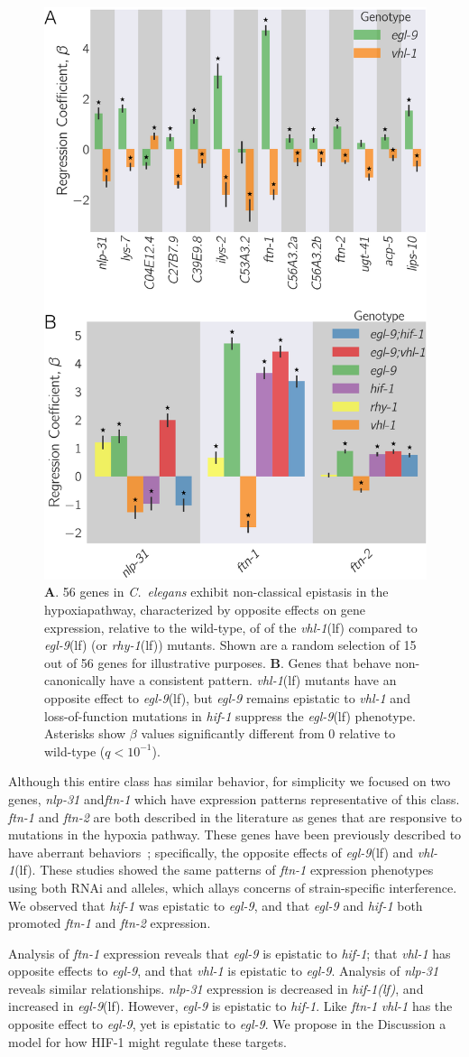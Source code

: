 \documentclass[9pt,twocolumn,twoside,lineno]{pnas-new}
\newcommand{\qval}[1]{$q<10^{-#1}$}
\newcommand{\cel}{\emph{C.~elegans}}
\newcommand{\gene}[1]{\mbox{\emph{#1}}}
\newcommand{\nlp}{\gene{nlp-31}}
\newcommand{\ftna}{\gene{ftn-1}}
\newcommand{\ftnb}{\gene{ftn-2}}
\newcommand{\egl}{\gene{egl-9}(lf)}
\newcommand{\rhy}{\gene{rhy-1}(lf)}
\newcommand{\vhl}{\gene{vhl-1}(lf)}
\newcommand{\hif}{\gene{hif-1(lf)}}
\newcommand{\hifp}{HIF-1}
\newcommand{\hifohtargets}{56}
\begin{document}
\begin{figure}[tbhp]
  \centering
  \includegraphics[width=.4\textwidth]{../figs/hif1oh_epistasis.pdf}
  \caption{
    \textbf{A}. \hifohtargets{} genes in \cel{} exhibit non-classical epistasis
    in the hypoxiapathway, characterized by opposite effects on gene expression,
    relative to the wild-type, of of the \vhl{} compared to \egl{} (or \rhy{})
    mutants. Shown are a random selection of 15 out of \hifohtargets{} genes for
    illustrative purposes. \textbf{B}. Genes that behave non-canonically  have a
    consistent pattern. \vhl{} mutants have an opposite effect to \egl{}, but
    \gene{egl-9} remains epistatic to \gene{vhl-1} and loss-of-function
    mutations in \gene{hif-1} suppress the \egl{} phenotype. Asterisks show
    $\beta$ values significantly different from 0 relative to wild-type
    (\qval{1}).
  }
\label{fig:hif1oh}
\end{figure}

Although this entire class has similar behavior, for simplicity we focused on
two genes, \nlp{} and\ftna{} which have expression patterns representative
of this class. \ftna{} and \ftnb{} are both described in
the literature as genes that are responsive to mutations in the hypoxia pathway.
These genes have been previously described to have aberrant
behaviors~\cite{Ackerman2012,Romney2011}; specifically, the opposite effects of
\egl{} and \vhl{}. These studies showed the same patterns of \ftna{}
expression phenotypes using both RNAi and alleles, which allays concerns of
strain-specific interference.
We observed that \gene{hif-1} was epistatic to
\gene{egl-9}, and that \gene{egl-9} and \gene{hif-1} both promoted \ftna{} and
\ftnb{} expression.

Analysis of \ftna{} expression reveals that \gene{egl-9} is
epistatic to \gene{hif-1}; that \gene{vhl-1} has opposite effects to
\gene{egl-9}, and that \gene{vhl-1} is epistatic to \gene{egl-9}. Analysis of
\nlp{} reveals similar relationships. \nlp{} expression is decreased in \hif{},
and increased in \egl{}. However, \gene{egl-9} is epistatic to \gene{hif-1}.
Like \ftna{} \gene{vhl-1} has the opposite effect to \gene{egl-9},
yet is epistatic to \gene{egl-9}. We propose in the Discussion a model for how
\hifp{} might regulate these targets.
\end{document}
